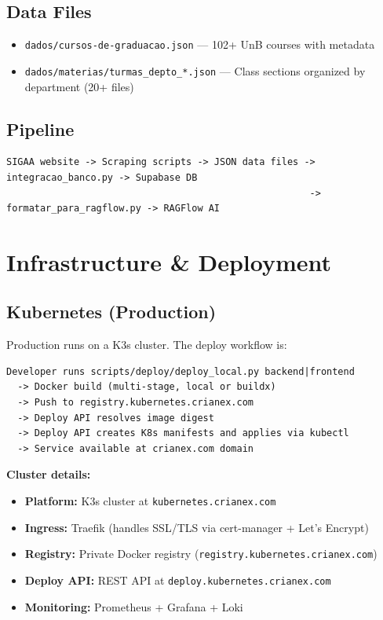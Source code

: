 \documentclass[11pt,a4paper]{article}
\newcommand{\code}[1]{\texttt{#1}}
\begin{document}
\subsection{Data Files}
\begin{itemize}[noitemsep]
    \item \code{dados/cursos-de-graduacao.json} — 102+ UnB courses with metadata
    \item \code{dados/materias/turmas\_depto\_*.json} — Class sections organized by department (20+ files)
\end{itemize}

\subsection{Pipeline}

\begin{lstlisting}
SIGAA website -> Scraping scripts -> JSON data files -> integracao_banco.py -> Supabase DB
                                                      -> formatar_para_ragflow.py -> RAGFlow AI
\end{lstlisting}

\section{Infrastructure \& Deployment}

\subsection{Kubernetes (Production)}

Production runs on a K3s cluster. The deploy workflow is:

\begin{lstlisting}
Developer runs scripts/deploy/deploy_local.py backend|frontend
  -> Docker build (multi-stage, local or buildx)
  -> Push to registry.kubernetes.crianex.com
  -> Deploy API resolves image digest
  -> Deploy API creates K8s manifests and applies via kubectl
  -> Service available at crianex.com domain
\end{lstlisting}

\noindent\textbf{Cluster details:}
\begin{itemize}[noitemsep]
    \item \textbf{Platform:} K3s cluster at \code{kubernetes.crianex.com}
    \item \textbf{Ingress:} Traefik (handles SSL/TLS via cert-manager + Let's Encrypt)
    \item \textbf{Registry:} Private Docker registry (\code{registry.kubernetes.crianex.com})
    \item \textbf{Deploy API:} REST API at \code{deploy.kubernetes.crianex.com}
    \item \textbf{Monitoring:} Prometheus + Grafana + Loki
\end{itemize}
\end{document}
